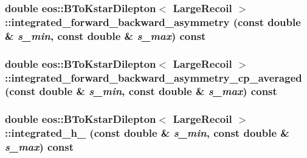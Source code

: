 \label{classeos_1_1BToKstarDilepton_3_01LargeRecoil_01_4_adbfb9ebdedeba02edf74bf82ca7c1b6e}
\hypertarget{classeos_1_1BToKstarDilepton_3_01LargeRecoil_01_4_a0161b6759525b9dafca8b4524c591c07}{
\subsubsection[{integrated\_\-forward\_\-backward\_\-asymmetry}]{\setlength{\rightskip}{0pt plus 5cm}double eos::BToKstarDilepton$<$ {\bf LargeRecoil} $>$::integrated\_\-forward\_\-backward\_\-asymmetry (const double \& {\em s\_\-min}, \/  const double \& {\em s\_\-max}) const}}
\label{classeos_1_1BToKstarDilepton_3_01LargeRecoil_01_4_a0161b6759525b9dafca8b4524c591c07}
\hypertarget{classeos_1_1BToKstarDilepton_3_01LargeRecoil_01_4_acaa928d3d2d91df748a418c1d333de0c}{
\subsubsection[{integrated\_\-forward\_\-backward\_\-asymmetry\_\-cp\_\-averaged}]{\setlength{\rightskip}{0pt plus 5cm}double eos::BToKstarDilepton$<$ {\bf LargeRecoil} $>$::integrated\_\-forward\_\-backward\_\-asymmetry\_\-cp\_\-averaged (const double \& {\em s\_\-min}, \/  const double \& {\em s\_\-max}) const}}
\label{classeos_1_1BToKstarDilepton_3_01LargeRecoil_01_4_acaa928d3d2d91df748a418c1d333de0c}
\hypertarget{classeos_1_1BToKstarDilepton_3_01LargeRecoil_01_4_a9406f153b7bcda724228031edccb4eff}{
\subsubsection[{integrated\_\-h\_\-1}]{\setlength{\rightskip}{0pt plus 5cm}double eos::BToKstarDilepton$<$ {\bf LargeRecoil} $>$::integrated\_\-h\_ (const double \& {\em s\_\-min}, \/  const double \& {\em s\_\-max}) const}}
